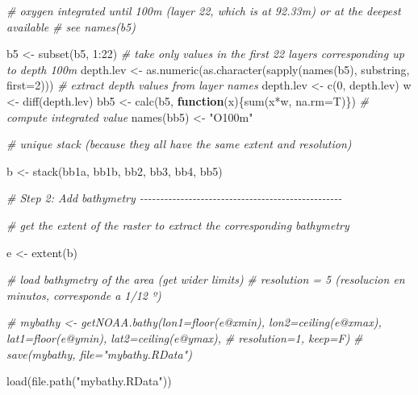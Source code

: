 \documentclass[
]{book}
\newenvironment{Shaded}{\begin{snugshade}}{\end{snugshade}}
\newcommand{\AttributeTok}[1]{\textcolor[rgb]{0.77,0.63,0.00}{#1}}
\newcommand{\CommentTok}[1]{\textcolor[rgb]{0.56,0.35,0.01}{\textit{#1}}}
\newcommand{\ControlFlowTok}[1]{\textcolor[rgb]{0.13,0.29,0.53}{\textbf{#1}}}
\newcommand{\DecValTok}[1]{\textcolor[rgb]{0.00,0.00,0.81}{#1}}
\newcommand{\FunctionTok}[1]{\textcolor[rgb]{0.00,0.00,0.00}{#1}}
\newcommand{\NormalTok}[1]{#1}
\newcommand{\OtherTok}[1]{\textcolor[rgb]{0.56,0.35,0.01}{#1}}
\newcommand{\SpecialCharTok}[1]{\textcolor[rgb]{0.00,0.00,0.00}{#1}}
\newcommand{\StringTok}[1]{\textcolor[rgb]{0.31,0.60,0.02}{#1}}
\begin{document}
\begin{Shaded}
\begin{Highlighting}[]
\CommentTok{\# oxygen integrated until 100m (layer 22, which is at 92.33m) or at the deepest available }
\CommentTok{\# see names(b5)}

\NormalTok{b5 }\OtherTok{\textless{}{-}} \FunctionTok{subset}\NormalTok{(b5, }\DecValTok{1}\SpecialCharTok{:}\DecValTok{22}\NormalTok{) }\CommentTok{\# take only values in the first 22 layers corresponding up to depth 100m}
\NormalTok{depth.lev }\OtherTok{\textless{}{-}} \FunctionTok{as.numeric}\NormalTok{(}\FunctionTok{as.character}\NormalTok{(}\FunctionTok{sapply}\NormalTok{(}\FunctionTok{names}\NormalTok{(b5), substring, }\AttributeTok{first=}\DecValTok{2}\NormalTok{))) }\CommentTok{\# extract depth values from layer names}
\NormalTok{depth.lev }\OtherTok{\textless{}{-}} \FunctionTok{c}\NormalTok{(}\DecValTok{0}\NormalTok{, depth.lev)}
\NormalTok{w }\OtherTok{\textless{}{-}} \FunctionTok{diff}\NormalTok{(depth.lev)}
\NormalTok{bb5 }\OtherTok{\textless{}{-}} \FunctionTok{calc}\NormalTok{(b5, }\ControlFlowTok{function}\NormalTok{(x)\{}\FunctionTok{sum}\NormalTok{(x}\SpecialCharTok{*}\NormalTok{w, }\AttributeTok{na.rm=}\NormalTok{T)\}) }\CommentTok{\# compute integrated value}
\FunctionTok{names}\NormalTok{(bb5) }\OtherTok{\textless{}{-}} \StringTok{"O100m"}

\CommentTok{\# unique stack (because they all have the same extent and resolution)}

\NormalTok{b }\OtherTok{\textless{}{-}} \FunctionTok{stack}\NormalTok{(bb1a, bb1b, bb2, bb3, bb4, bb5)}

\CommentTok{\# Step 2: Add bathymetry {-}{-}{-}{-}{-}{-}{-}{-}{-}{-}{-}{-}{-}{-}{-}{-}{-}{-}{-}{-}{-}{-}{-}{-}{-}{-}{-}{-}{-}{-}{-}{-}{-}{-}{-}{-}{-}{-}{-}{-}{-}{-}{-}{-}{-}{-}{-}{-}{-}{-}}

\CommentTok{\# get the extent of the raster to extract the corresponding bathymetry}

\NormalTok{e }\OtherTok{\textless{}{-}} \FunctionTok{extent}\NormalTok{(b)}

\CommentTok{\# load bathymetry of the area (get wider limits)}
\CommentTok{\# resolution = 5 (resolucion en minutos, corresponde a 1/12 º) }

\CommentTok{\# mybathy \textless{}{-} getNOAA.bathy(lon1=floor(e@xmin), lon2=ceiling(e@xmax), lat1=floor(e@ymin), lat2=ceiling(e@ymax), }
\CommentTok{\#                          resolution=1, keep=F) }
\CommentTok{\# save(mybathy, file="mybathy.RData")}

\FunctionTok{load}\NormalTok{(}\FunctionTok{file.path}\NormalTok{(}\StringTok{"mybathy.RData"}\NormalTok{))}
     

\end{Highlighting}
\end{Shaded}
\end{document}
